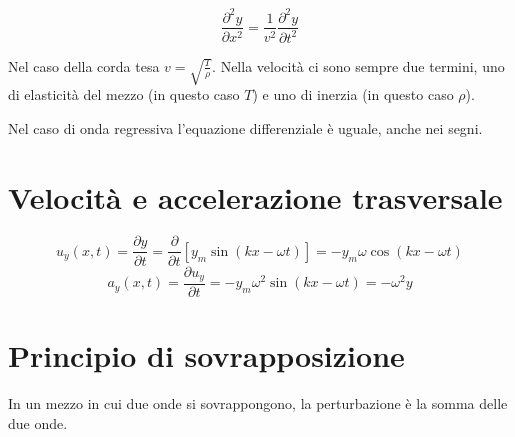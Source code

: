 \begin{equation}
\frac{\partial^2 y}{\partial x^2}=\frac{1}{v^2}\frac{\partial^2 y}{\partial t^2}
\end{equation}

Nel caso della corda tesa $v=\sqrt{\frac{T}{\rho}}$. Nella velocità ci sono sempre due termini, uno di elasticità del mezzo (in questo caso $T$) e uno di inerzia (in questo caso $\rho$).

Nel caso di onda regressiva l'equazione differenziale è uguale, anche nei segni.
\section{Velocità e accelerazione trasversale}
$$u_y(x,t)=\frac{\partial y}{\partial t}=\frac{\partial}{\partial t}\left[y_m\sin\left(kx-\omega t\right)\right]=-y_m\omega\cos\left(kx-\omega t\right)$$
$$a_y(x,t)=\frac{\partial u_y}{\partial t}=-y_m\omega^2\sin\left(kx-\omega t\right)=-\omega^2 y$$
\section{Principio di sovrapposizione}
\begin{Pri}[sovrapposizione]
In un mezzo in cui due onde si sovrappongono, la perturbazione è la somma delle due onde.
\end{Pri}

